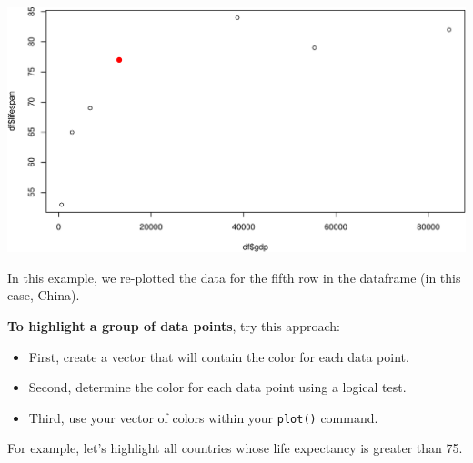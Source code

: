 \documentclass[
]{book}
\newenvironment{Shaded}{\begin{snugshade}}{\end{snugshade}}
\newcommand{\DataTypeTok}[1]{\textcolor[rgb]{0.13,0.29,0.53}{#1}}
\newcommand{\DecValTok}[1]{\textcolor[rgb]{0.00,0.00,0.81}{#1}}
\newcommand{\FloatTok}[1]{\textcolor[rgb]{0.00,0.00,0.81}{#1}}
\newcommand{\KeywordTok}[1]{\textcolor[rgb]{0.13,0.29,0.53}{\textbf{#1}}}
\newcommand{\NormalTok}[1]{#1}
\newcommand{\OperatorTok}[1]{\textcolor[rgb]{0.81,0.36,0.00}{\textbf{#1}}}
\newcommand{\StringTok}[1]{\textcolor[rgb]{0.31,0.60,0.02}{#1}}
\begin{document}
\begin{Shaded}
\end{Shaded}

\includegraphics{figures/unnamed-chunk-548-1.pdf}

In this example, we re-plotted the data for the fifth row in the dataframe (in this case, China).

\textbf{To highlight a group of data points}, try this approach:

\begin{itemize}
\item
  First, create a vector that will contain the color for each data point.
\item
  Second, determine the color for each data point using a logical test.
\item
  Third, use your vector of colors within your \texttt{plot()} command.
\end{itemize}

For example, let's highlight all countries whose life expectancy is greater than 75.
\end{document}
